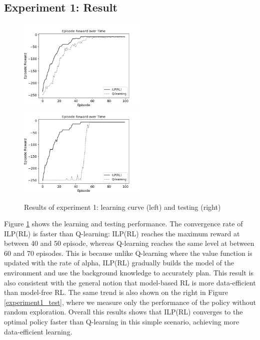 \subsection{Experiment 1: Result}
\label{subsec:experiment1_result}

\begin{figure}[!htb]
\centerline{
\includegraphics[width=0.55\textwidth]{./figures/experiment1_training}
\includegraphics[width=0.55\textwidth]{./figures/experiment1_test}
}
\caption{Results of experiment 1: learning curve (left) and testing (right)}
\label{experiment1_result}
\end{figure}

Figure \ref{experiment1_result} shows the learning and testing performance.
The convergence rate of ILP(RL) is faster than Q-learning: ILP(RL) reaches the maximum reward at between 40 and 50 episode, 
whereas Q-learning reaches the same level at between 60 and 70 episodes.
This is because unlike Q-learning where the value function is updated with the rate of alpha, ILP(RL) gradually builds the model of the environment and use the background knowledge to accurately plan.
This result is also consistent with the general notion that model-based RL is more data-efficient than model-free RL.
The same trend is also shown on the right in Figure \ref{experiment1_test}, where we measure only the performance of the policy without random exploration.
Overall this results shows that ILP(RL) converges to the optimal policy faster than Q-learning in this simple scenario, achieving more data-efficient learning.

